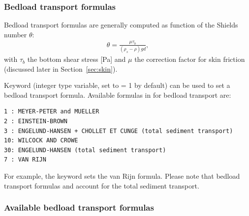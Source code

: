 \subsubsection{Bedload transport formulas}
Bedload transport formulas are generally computed as function of the Shields number $\theta$:
\begin{align}
\theta=\frac{\mu\tau_b}{(\rho_s-\rho)gd},
\label{eq:shieldsp}
\end{align}
with $\tau_b$ the bottom shear stress [Pa] and $\mu$ the correction factor for skin friction (discussed later in Section~\ref{sec:skin}).

Keyword  (integer type variable, set to {\ttfamily = 1} by default) can be used to set a bedload transport formula.
Available formulas in \gaia{} for bedload transport are:
\begin{lstlisting}[frame=trBL]
1 : MEYER-PETER and MUELLER
2 : EINSTEIN-BROWN
3 : ENGELUND-HANSEN + CHOLLET ET CUNGE (total sediment transport)
10: WILCOCK AND CROWE
30: ENGELUND-HANSEN (total sediment transport)
7 : VAN RIJN
\end{lstlisting}
For example, the keyword  sets the van Rijn formula. Please note that bedload transport formulas  and  account for the total sediment transport.

\subsubsection{Available bedload transport formulas}
